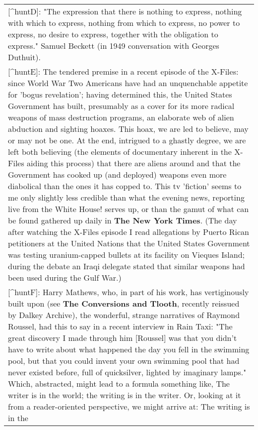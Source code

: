 \begin{longtable}[]{@{}l@{}}
\begin{minipage}[t]{0.97\columnwidth}
{[}\^{}huntD{]}: "The expression that there is nothing to express,
nothing with which to express, nothing from which to express, no power
to express, no desire to express, together with the obligation to
express." Samuel Beckett (in 1949 conversation with Georges
Duthuit).\strut
\end{minipage}\tabularnewline
\begin{minipage}[t]{0.97\columnwidth}\raggedright
{[}\^{}huntE{]}: The tendered premise in a recent episode of the
X-Files: since World War Two Americans have had an unquenchable appetite
for 'bogus revelation'; having determined this, the United States
Government has built, presumably as a cover for its more radical weapons
of mass destruction programs, an elaborate web of alien abduction and
sighting hoaxes. This hoax, we are led to believe, may or may not be
one. At the end, intrigued to a ghastly degree, we are left both
believing (the elements of documentary inherent in the X-Files aiding
this process) that there are aliens around and that the Government has
cooked up (and deployed) weapons even more diabolical than the ones it
has copped to. This tv 'fiction' seems to me only slightly less credible
than what the evening news, reporting live from the White House! serves
up, or than the gamut of what can be found gathered up daily in
\textbf{The New York Times}. (The day after watching the X-Files episode
I read allegations by Puerto Rican petitioners at the United Nations
that the United States Government was testing uranium-capped bullets at
its facility on Vieques Island; during the debate an Iraqi delegate
stated that similar weapons had been used during the Gulf War.)\strut
\end{minipage}\tabularnewline
\begin{minipage}[t]{0.97\columnwidth}\raggedright
{[}\^{}huntF{]}: Harry Mathews, who, in part of his work, has
vertiginously built upon (see \textbf{The Conversions and Tlooth},
recently reissued by Dalkey Archive), the wonderful, strange narratives
of Raymond Roussel, had this to say in a recent interview in Rain Taxi:
"The great discovery I made through him {[}Roussel{]} was that you
didn't have to write about what happened the day you fell in the
swimming pool, but that you could invent your own swimming pool that had
never existed before, full of quicksilver, lighted by imaginary lamps."
Which, abstracted, might lead to a formula something like, The writer is
in the world; the writing is in the writer. Or, looking at it from a
reader-oriented perspective, we might arrive at: The writing is in the

\end{minipage}
\end{longtable}

